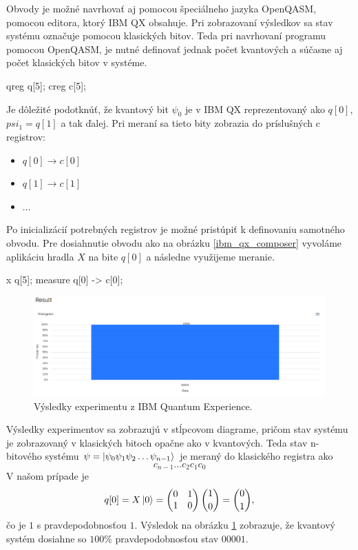 Obvody je možné navrhovať aj pomocou špeciálneho jazyka OpenQASM, pomocou
editora, ktorý IBM QX obsahuje. Pri zobrazovaní výsledkov sa stav systému 
označuje pomocou klasických bitov. Teda pri navrhovaní programu pomocou
OpenQASM, je nutné definovať jednak počet kvantových a súčasne aj počet 
klasických bitov v systéme.

\begin{code}
qreg q[5];
creg c[5];
\end{code}

Je dôležité podotknúť, že kvantový bit \(\psi_0\) je v IBM QX reprezentovaný
ako \(q[0]\), \(psi_1 = q[1]\) a tak ďalej. Pri meraní sa tieto bity zobrazia
do príslušných c registrov:
\begin{itemize}
\item[] \(q[0] \rightarrow c[0]\)
\item[] \(q[1] \rightarrow c[1]\)
\item[] \(\dots\)
\end{itemize}

Po inicializácií potrebných registrov je možné pristúpiť k definovaniu 
samotného obvodu. Pre dosiahnutie obvodu ako na obrázku \ref{ibm_qx_composer}
vyvoláme aplikáciu hradla \(X\) na bite \(q[0]\) a následne využijeme meranie.

\begin{code}
x q[5];
measure q[0] -> c[0];
\end{code}

\begin{figure} 
	\centering 
	\includegraphics[width=1\textwidth]{figures/ibm_qx_results.png} 
	\caption{Výsledky experimentu z IBM Quantum Experience.}
    \label{ibm_qx_results}
\end{figure}

Výsledky experimentov sa zobrazujú v stĺpcovom diagrame, pričom stav systému
je zobrazovaný v klasických bitoch opačne ako v kvantových. Teda stav 
n-bitového systému \(\psi = \Ket{\psi_0\psi_1\psi_2 \dots \psi_{n-1}}\) je
meraný do klasického registra ako 
\[c_{n-1} \dots c_2 c_1 c_0\]
V našom prípade je
\[q[0] = X \Ket{0} =
\begin{pmatrix}
0 & 1\\
1 & 0\\
\end{pmatrix}
\binom{1}{0} = \binom{0}{1}
,\]
čo je \(1\) s pravdepodobnosťou \(1\). Výsledok na obrázku 
\ref{ibm_qx_results} zobrazuje, že kvantový systém dosiahne so \(100\%\) 
pravdepodobnosťou stav \(00001\).

